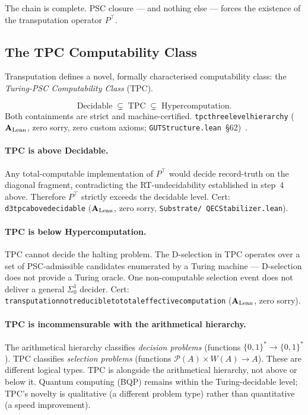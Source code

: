 \documentclass[11pt,openany]{book}
\theoremstyle{remark}
\newcommand{\lean}[1]{%
  \penalty-100
  \begingroup\def\_{\textunderscore\allowbreak}\texttt{#1}\endgroup}
\newcommand{\CatAL}{\ensuremath{\textbf{A}_{\rm Lean}}}
\begin{document}
The chain is complete.  PSC closure --- and nothing else --- forces the existence
of the transputation operator $P^\top$.

\subsection*{The TPC Computability Class}

Transputation defines a novel, formally characterised computability class:
the \emph{Turing-PSC Computability Class} (TPC).

\begin{tcolorbox}[colback=orange!5,colframe=orange!60,
  title={Result: TPC Strict Containment (\CatAL)}]
  \[
    \text{Decidable} \;\subsetneq\; \text{TPC} \;\subsetneq\; \text{Hypercomputation.}
  \]
  Both containments are strict and machine-certified.
  \lean{tpc\_three\_level\_hierarchy} (\CatAL, zero sorry, zero custom axioms;
  \texttt{GUTStructure.lean}~§62)~\cite{SpivackGTEMobius}.
\end{tcolorbox}

\paragraph{TPC is above Decidable.}
Any total-computable implementation of $P^\top$ would decide record-truth on the
diagonal fragment, contradicting the RT-undecidability established in step~4 above.
Therefore $P^\top$ strictly exceeds the decidable level.
Cert: \lean{d3\_tpc\_above\_decidable} (\CatAL, zero sorry, \texttt{Substrate/%
QECStabilizer.lean}).

\paragraph{TPC is below Hypercomputation.}
TPC cannot decide the halting problem.  The D-selection in TPC operates over a set
of PSC-admissible candidates enumerated by a Turing machine --- D-selection does not
provide a Turing oracle.  One non-computable selection event does not deliver a
general $\Sigma^1_0$ decider.
Cert: \lean{transputation\_not\_reducible\_to\_total\_effective\_computation}
(\CatAL, zero sorry).

\paragraph{TPC is incommensurable with the arithmetical hierarchy.}
The arithmetical hierarchy classifies \emph{decision problems}
(functions $\{0,1\}^* \to \{0,1\}^*$).  TPC classifies \emph{selection problems}
(functions $\mathcal{P}(A) \times W(A) \to A$).  These are different logical types.
TPC is alongside the arithmetical hierarchy, not above or below it.  Quantum computing
(BQP) remains within the Turing-decidable level; TPC's novelty is qualitative (a
different problem type) rather than quantitative (a speed improvement).
\end{document}

